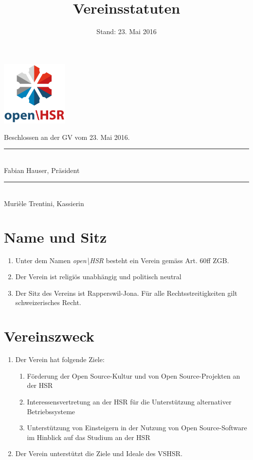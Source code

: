 \documentclass[10pt,a4paper,parskip,fleqn]{scrartcl}
\title{\Huge Vereinsstatuten}
\date{Stand: 23. Mai 2016}
\newcommand{\ol}{\begin{enumerate}[itemsep=-0.2em,topsep=-0.2em]}
\newcommand{\lo}{\end{enumerate}}
\newcommand{\li}{\item}
\begin{document}
\begin{titlepage}
  \maketitle
  \thispagestyle{empty} %
  \begin{center}
    \includegraphics[width=0.25\textwidth]{logo.png}\\

    \vfill

    \large Beschlossen an der GV vom 23. Mai 2016.

    \vspace{1.5cm}

    \begin{minipage}[t]{0.49\textwidth}
      \center
      \rule{5cm}{0.2mm}\\
      Fabian Hauser, Präsident
      \endcenter
    \end{minipage}
    \begin{minipage}[t]{0.49\textwidth}
      \center
      \rule{5cm}{0.2mm}\\
      Murièle Trentini, Kassierin
      \endcenter
    \end{minipage}
  \end{center}
\end{titlepage}


\section{Name und Sitz}

\ol
  \li Unter dem Namen \textit{open\textbackslash{}HSR} besteht ein Verein gemäss Art. 60ff
  ZGB.
  \li Der Verein ist religiös unabhängig und politisch neutral
  \li Der Sitz des Vereins ist Rapperswil-Jona. Für alle Rechtsstreitigkeiten
  gilt schweizerisches Recht.
\lo


\section{Vereinszweck}

\ol
  \li Der Verein hat folgende Ziele:
    \ol
      \li Förderung der Open Source-Kultur und von Open Source-Projekten an
      der HSR
      \li Interessensvertretung an der HSR für die Unterstützung
      alternativer Betriebssysteme
      \li Unterstützung von Einsteigern in der Nutzung von Open
      Source-Software im Hinblick auf das Studium an der HSR
    \lo
  \li Der Verein unterstützt die Ziele und Ideale des VSHSR. 
\lo
\end{document}
